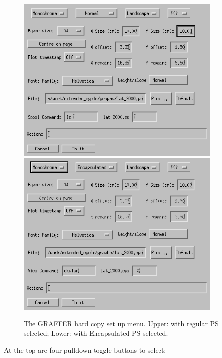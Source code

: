 \documentclass[11pt,twoside,english]{article}
\begin{document}
 \begin{figure}[htbp]
   \centering
   \includegraphics[width=10cm]{hardopts_ps}\vspace{5mm}
   \includegraphics[width=10cm]{hardopts_eps}
   \caption{The GRAFFER hard copy set up menu. Upper: with regular PS
     selected; Lower: with Encapsulated PS selected.}
   \label{hardcopy menu}
 \end{figure}
 At the top are four pulldown toggle buttons to select:
\end{document}
